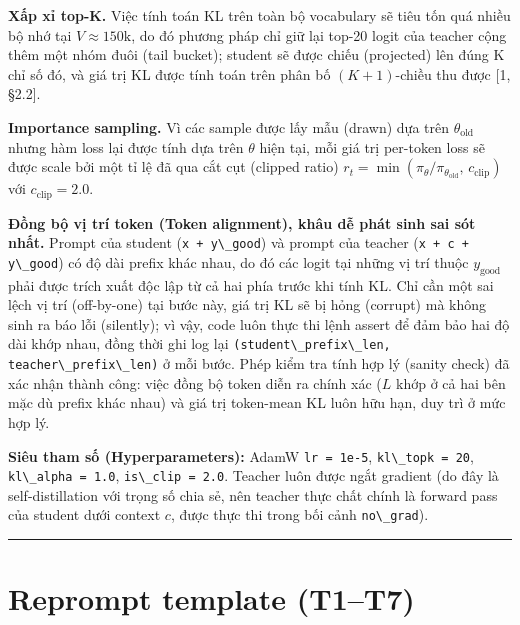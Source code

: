 \textbf{Xấp xỉ top-K.} Việc tính toán KL trên toàn bộ vocabulary sẽ tiêu tốn quá nhiều bộ nhớ tại \(V \approx 150\text{k}\), do đó phương pháp chỉ giữ lại top-20 logit của teacher cộng thêm một nhóm đuôi (tail bucket); student sẽ được chiếu (projected) lên đúng K chỉ số đó, và giá trị KL được tính toán trên phân bố \((K{+}1)\)-chiều thu được {[}1, §2.2{]}.

\textbf{Importance sampling.} Vì các sample được lấy mẫu (drawn) dựa trên \(\theta_{\text{old}}\) nhưng hàm loss lại được tính dựa trên \(\theta\) hiện tại, mỗi giá trị per-token loss sẽ được scale bởi một tỉ lệ đã qua cắt cụt (clipped ratio) \(r_t = \min(\pi_\theta/\pi_{\theta_\text{old}},\, c_{\text{clip}})\) với \(c_{\text{clip}} = 2.0\).

\textbf{Đồng bộ vị trí token (Token alignment), khâu dễ phát sinh sai sót nhất.} Prompt của student (\passthrough{\lstinline!x + y\_good!}) và prompt của teacher (\passthrough{\lstinline!x + c + y\_good!}) có độ dài prefix khác nhau, do đó các logit tại những vị trí thuộc \(y_{\text{good}}\) phải được trích xuất độc lập từ cả hai phía trước khi tính KL. Chỉ cần một sai lệch vị trí (off-by-one) tại bước này, giá trị KL sẽ bị hỏng (corrupt) mà không sinh ra báo lỗi (silently); vì vậy, code luôn thực thi lệnh assert để đảm bảo hai độ dài khớp nhau, đồng thời ghi log lại \passthrough{\lstinline!(student\_prefix\_len, teacher\_prefix\_len)!} ở mỗi bước. Phép kiểm tra tính hợp lý (sanity check) đã xác nhận thành công: việc đồng bộ token diễn ra chính xác (\(L\) khớp ở cả hai bên mặc dù prefix khác nhau) và giá trị token-mean KL luôn hữu hạn, duy trì ở mức hợp lý.

\textbf{Siêu tham số (Hyperparameters):} AdamW \passthrough{\lstinline!lr = 1e-5!}, \passthrough{\lstinline!kl\_topk = 20!}, \passthrough{\lstinline!kl\_alpha = 1.0!}, \passthrough{\lstinline!is\_clip = 2.0!}. Teacher luôn được ngắt gradient (do đây là self-distillation với trọng số chia sẻ, nên teacher thực chất chính là forward pass của student dưới context \(c\), được thực thi trong bối cảnh \passthrough{\lstinline!no\_grad!}).

\begin{center}\rule{0.5\linewidth}{0.5pt}\end{center}

\section{Reprompt template (T1--T7)}\label{reprompt-templates-t1t7}

